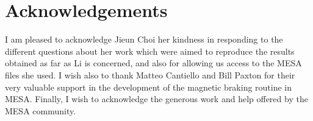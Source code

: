 \documentclass[fleqn,usenatbib]{mnras}
\begin{document}
\section*{Acknowledgements}
I am pleased to acknowledge Jieun Choi her kindness in responding to the different questions about her work which were aimed to reproduce the results obtained as far as Li is concerned, and also for allowing us access to the MESA files she used. I wish also to thank Matteo Cantiello and Bill Paxton for their very valuable support in the development of the magnetic braking routine in MESA. Finally, I wish to acknowledge the generous work and help offered by the MESA community.












\bsp	%
\label{lastpage}
\end{document}
